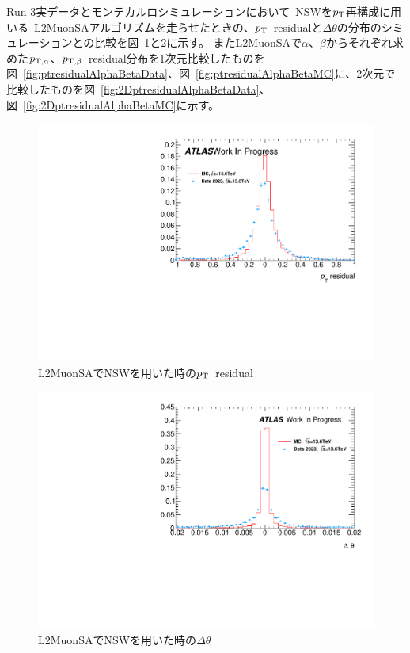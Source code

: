 Run-3実データとモンテカルロシミュレーションにおいて~NSWを$p_\mathrm{T}$再構成に用いる~L2MuonSAアルゴリズムを走らせたときの、$p_\mathrm{T}$~residualと$\Delta\theta$の分布のシミュレーションとの比較を図~\ref{fig:ptresidualDataMC}と\ref{fig:deltaThetaDataMC}に示す。
またL2MuonSAで$\alpha$、$\beta$からそれぞれ求めた$p_{\rm{T, \alpha}}$、$p_{\rm{T, \beta}}$~residual分布を1次元比較したものを図~\ref{fig:ptresidualAlphaBetaData}、図~\ref{fig:ptresidualAlphaBetaMC}に、2次元で比較したものを図~\ref{fig:2DptresidualAlphaBetaData}、図~\ref{fig:2DptresidualAlphaBetaMC}に示す。
\begin{figure}[H]
    \centering
    \includegraphics[clip, width=12cm]{fig/5/ptresidual_NSW.pdf}
    \caption{L2MuonSAでNSWを用いた時の$p_\mathrm{T}$~residual}
    \label{fig:ptresidualDataMC}
\end{figure}

\begin{figure}[H]
    \centering
    \includegraphics[clip, width=12cm]{fig/5/deltaTheta_NSW.pdf}
    \caption{L2MuonSAでNSWを用いた時の$\Delta \theta$}
    \label{fig:deltaThetaDataMC}
\end{figure}


